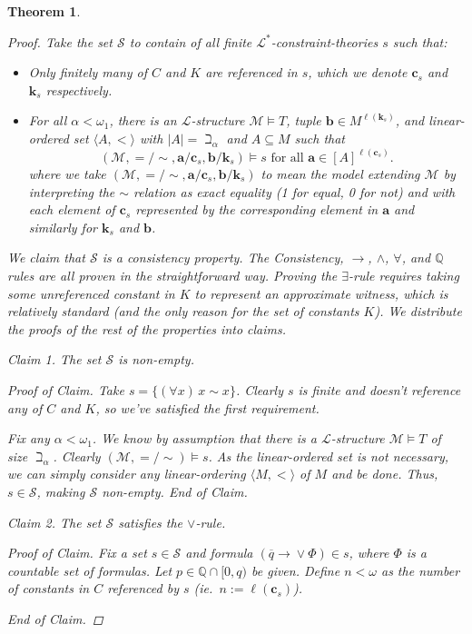 \documentclass{amsart}
\newtheorem{theorem}{Theorem}[section]
\theoremstyle{definition}
\numberwithin{equation}{theorem}
\newcommand{\Q}{\mathbb{Q}}
\newcommand{\V}{\mathbf}
\newcommand{\unvee}{{\vee}}
\newcommand{\rat}[1]{{\overline{#1}}}
\newcommand{\narrow}[1]{\xrightarrow{#1}}
\renewcommand{\to}{\narrow{}}
\newcommand{\len}{\ell}
\newcommand{\frag}{\mathcal{L}}
\newenvironment{claim}[1]{\vspace{.07in}\par\noindent\emph{Claim #1.}\space}{}
\newenvironment{claimproof}{\vspace{.07in}\par\noindent\emph{Proof of Claim.}\space}{\hfill \emph{End of Claim.}}
\begin{document}
\begin{theorem}
\begin{proof}
    Take the set $\mathscr{S}$ to contain of all finite $\frag^*$-constraint-theories $s$ such that:
    \begin{itemize}
    \item Only finitely many of $C$ and $K$ are referenced in $s$, which we denote $\V c_s$ and $\V k_s$ respectively.
    \item For all $\alpha<\omega_1$, there is an $\frag$-structure $\mathcal M\models T$, tuple $\V b\in M^{\len(\V k_s)}$, and linear-ordered set $\langle A,<\rangle$ with $|A|=\beth_\alpha$ and $A\subseteq M$ such that 
    \[
      (\mathcal M,{=}/{\sim},\V a/\V c_s, \V b/\V k_s)\models s\text{ for all $\V a\in[A]^{\len(\V c_s)}$}.
    \]
    where we take $(\mathcal M,{=}/{\sim},\V a/\V c_s,\V b/\V k_s)$ to mean the model extending $\mathcal M$ by interpreting the $\sim$ relation as exact equality (1 for equal, 0 for not) and with each element of $\V c_s$ represented by the corresponding element in $\V a$ and similarly for $\V k_s$ and $\V b$.
    \end{itemize}
    We claim that $\mathscr{S}$ is a consistency property.
    The Consistency, $\rightarrow$, $\wedge$, $\forall$, and $\Q$ rules are all proven in the straightforward way.
    Proving the $\exists$-rule requires taking some unreferenced constant in $K$ to represent an approximate witness, which is relatively standard (and the only reason for the set of constants $K$).
    We distribute the proofs of the rest of the properties into claims.
    \begin{claim}{1}
      The set $\mathscr{S}$ is non-empty.
      \begin{claimproof}
        Take $s=\{(\forall x)\,x\sim x\}$.
        Clearly $s$ is finite and doesn't reference any of $C$ and $K$, so we've satisfied the first requirement.
        
        Fix any $\alpha<\omega_1$.
        We know by assumption that there is a $\frag$-structure $\mathcal M\models T$ of size $\beth_\alpha$.
        Clearly $(\mathcal M,{=}/{\sim})\models s$.
        As the linear-ordered set is not necessary, we can simply consider any linear-ordering $\langle M,<\rangle$ of $M$ and be done.
        Thus, $s\in \mathscr{S}$, making $\mathscr{S}$ non-empty.
      \end{claimproof}
    \end{claim}
    \begin{claim}{2}
      The set $\mathscr{S}$ satisfies the $\vee$-rule.
      \begin{claimproof}
        Fix a set $s\in \mathscr{S}$ and formula $(\rat q\to\unvee\Phi)\in s$, where $\Phi$ is a countable set of formulas.
        Let $p\in\Q\cap[0,q)$ be given.
        Define $n<\omega$ as the number of constants in $C$ referenced by $s$ (ie.\ $n:=\len(\V c_s)$).
        

\end{claimproof}
\end{claim}
\end{proof}
\end{theorem}
\end{document}
